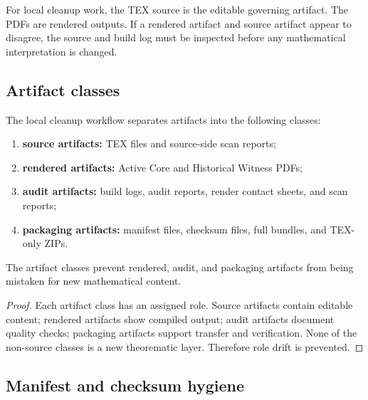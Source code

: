 \begin{remark}
\label{rem:v4013-source-governing-over-generated-artifacts}
For local cleanup work, the TEX source is the editable governing artifact. The
PDFs are rendered outputs. If a rendered artifact and source artifact appear to
disagree, the source and build log must be inspected before any mathematical
interpretation is changed.
\end{remark}

\subsection{Artifact classes}
\label{subsec:v4013-artifact-classes}

\begin{definition}
\label{def:v4013-artifact-classes}
The local cleanup workflow separates artifacts into the following classes:
\begin{enumerate}[leftmargin=*]
 \item \textbf{source artifacts:} TEX files and source-side scan reports;
 \item \textbf{rendered artifacts:} Active Core and Historical Witness PDFs;
 \item \textbf{audit artifacts:} build logs, audit reports, render contact
 sheets, and scan reports;
 \item \textbf{packaging artifacts:} manifest files, checksum files, full
 bundles, and TEX-only ZIPs.
\end{enumerate}
\end{definition}

\begin{lemma}
\label{lem:v4013-artifact-classes-prevent-role-drift}
The artifact classes prevent rendered, audit, and packaging artifacts from
being mistaken for new mathematical content.
\end{lemma}

\begin{proof}
Each artifact class has an assigned role. Source artifacts contain editable
content; rendered artifacts show compiled output; audit artifacts document
quality checks; packaging artifacts support transfer and verification. None of
the non-source classes is a new theorematic layer. Therefore role drift is
prevented.
\end{proof}

\subsection{Manifest and checksum hygiene}
\label{subsec:v4013-manifest-checksum-hygiene}

